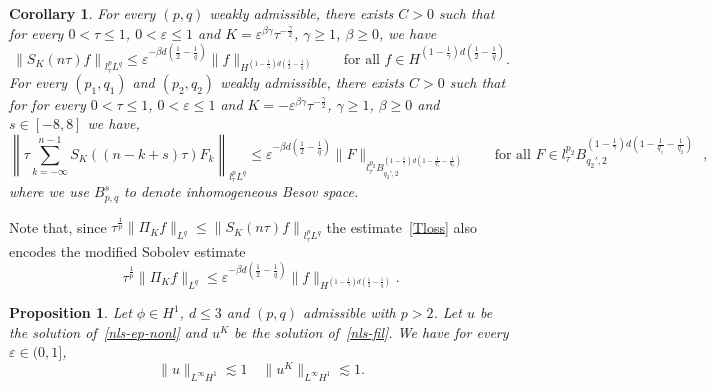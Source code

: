 \documentclass[10pt,a4paper]{article}
\newtheorem{corollary}[theorem]{Corollary}
\newtheorem{proposition}[theorem]{Proposition}
\begin{document}
  \begin{corollary}\label{corDSE}
    For every \((p,q)\) weakly admissible, there exists \(C>0\) such that 
    for every \(0<\tau \leq 1\), \( 0 < \varepsilon \leq 1 \) and 
    \(K = \varepsilon^{\beta\gamma}\tau^{-\frac\gamma2}\), \(\gamma \geq 1\), 
    \(\beta \geq 0\),  we have
    \begin{equation}
    \label{Tloss}
      \left\| S_{K}(n \tau) f\right\|_{l^p_\tau L^q} \leq \varepsilon^{-\beta d(\frac12-\frac1q)} 
      \|f \|_{H^{(1-\frac1\gamma)d(\frac12-\frac1q)}} \qquad \text{for all \(f \in H^{(1-\frac1\gamma)d(\frac12-\frac1q)}\)}. 
    \end{equation}
    For every \((p_1, q_1)\) and \((p_2, q_2)\) weakly admissible, there exists \(C>0\) such that for 
    for every \(0<\tau \leq 1\), \( 0 < \varepsilon \leq 1 \) and 
    \(K = -\varepsilon^{\beta\gamma}\tau^{-\frac\gamma2}\), \(\gamma \geq 1\), 
    \(\beta \geq 0\) and \(s \in [-8,8]\) we have,
    \begin{equation}
    \label{TT*loss}
      \left\| \tau  \sum_{k=-\infty}^{n-1} S_{K} ((n-k+s) \tau) F_k \right\|_{l^p_\tau L^q} 
      \leq \varepsilon^{-\beta d(\frac12-\frac1q)} \|F\|_{l^{p_2}_\tau B^{(1-\frac1\gamma)d(1-\frac1{q_1}-\frac1{q_2})}_{q_2',2}}\qquad 
      \text{for all  \(F\in l^{p_2}_\tau B^{(1-\frac1\gamma)d(1-\frac1{q_1}-\frac1{q_2})}_{q_2',2}\) },
    \end{equation}
    where we use \(B^s_{p,q}\) to denote inhomogeneous Besov space.
  \end{corollary}
  Note that, since \(\tau^\frac1p\| \Pi_{K} f\|_{L^q} \leq  \left\| S_{K}(n \tau) f\right\|_{l^p_{\tau}L^q}\) 
  the estimate~\eqref{Tloss} also encodes the modified Sobolev estimate
  \begin{equation}
    \label{sobmod}
    \tau^\frac1p \|\Pi_K f\|_{L^q} \leq \varepsilon^{-\beta d(\frac12-\frac1q)} \|f\|_{H^{(1-\frac1\gamma)d(\frac12-\frac1q)}}.
  \end{equation}



  
  \begin{proposition}
    Let \(\phi \in H^1\), \( d \leq 3 \) and \( (p,q) \) admissible with
    \( p > 2 \). Let \( u \) be the solution of~\eqref{nls-ep-nonl} and \(u^K\)
    be the solution of~\eqref{nls-fil}. We have for every \( \varepsilon \in 
    (0,1] \),
    \begin{equation}
      \|u\|_{L^\infty H^1} \lesssim 1 \quad
      \|u^K\|_{L^\infty H^1} \lesssim 1.
    \end{equation}
  \end{proposition}
  
\end{document}

